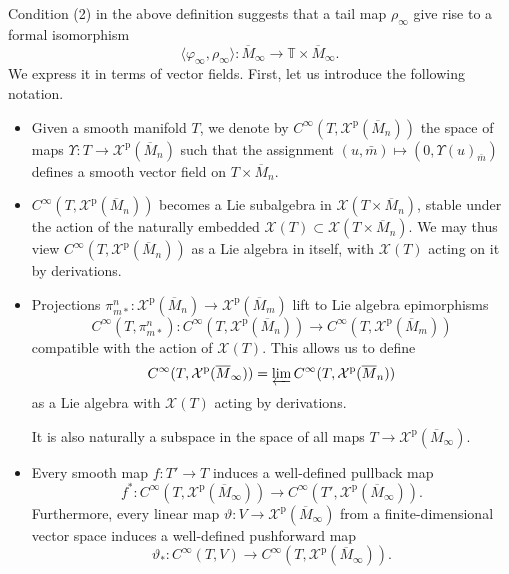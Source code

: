 \documentclass{article}
\def\TT{\mathbb{T}}
\def\XX{\mathcal{X}}
\def\p{\mathrm{p}}
\theoremstyle{definition}
\begin{document}
Condition (2) in the above definition suggests that
a tail map $\rho_\infty$ give rise to a formal isomorphism
$$\langle \varphi_\infty,\rho_\infty\rangle : \overline M_\infty \to \TT\times\overline M_\infty.$$
We express it in terms of vector fields. First,
let us introduce the following notation.
\begin{itemize}
\item
Given a smooth manifold $T$,
we denote by $C^\infty(T, \XX^\p(\overline M_n))$
the space of maps $\Upsilon : T \to \XX^\p(\overline M_n)$
such that
the assignment $(u, \bar m) \mapsto (0, \Upsilon(u)_{\bar m})$
defines a smooth vector field on $T \times \overline M_n$.
\item   $C^\infty(T, \XX^\p(\overline M_n))$ becomes a Lie subalgebra in $\XX(T\times\overline M_n)$,
        stable under the action of the naturally embedded $\XX(T) \subset \XX(T\times\overline M_n)$. 
        We may thus view $C^\infty(T, \XX^\p(\overline M_n))$
        as a Lie algebra in itself, with $\XX(T)$ acting on it by derivations. 
\item   Projections $\pi^n_{m*} : \XX^\p(\overline M_n) \to \XX^\p(\overline M_m)$ lift to Lie algebra epimorphisms $$C^\infty(T,\pi^n_{m*}) : C^\infty(T,\XX^\p(\overline M_n))
        \to C^\infty(T, \XX^\p(\overline M_m))$$ compatible with
        the action of $\XX(T)$.
        This allows us to define $$C^\infty(T, \XX^\p(\overline M_\infty)) 
        = \varprojlim C^\infty(T,\XX^\p(\overline M_n))$$
        as a Lie algebra with $\XX(T)$ acting by derivations. 
        
        It is also naturally a subspace
        in the space of all maps $T \to\XX^\p( \overline M_\infty )$.
\item Every smooth map $f:T' \to T$
        induces a well-defined pullback map
        $$f^*:C^\infty(T, \XX^\p(\overline M_\infty)) \to
        C^\infty(T', \XX^\p(\overline M_\infty)).$$
        Furthermore, every linear map
$\vartheta: V\to \XX^\p(\overline M_\infty)$ 
from a finite-dimensional vector space 
induces a well-defined pushforward map $$\vartheta_*:C^\infty(T,V) \to C^\infty(T,\XX^\p(\overline M_\infty)).$$
\end{itemize}
\end{document}
